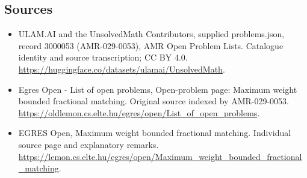 \documentclass[11pt,a4paper]{article}
\begin{document}
\subsection{Sources}
\begin{itemize}
\item[S1] ULAM.AI and the UnsolvedMath Contributors, supplied problems.json, record 3000053 (AMR-029-0053), AMR Open Problem Lists. Catalogue identity and source transcription; CC BY 4.0.
\url{https://huggingface.co/datasets/ulamai/UnsolvedMath}.
\item[S2] Egres Open - List of open problems, Open-problem page: Maximum weight bounded fractional matching. Original source indexed by AMR-029-0053.
\url{https://oldlemon.cs.elte.hu/egres/open/List_of_open_problems}.
\item[S3] EGRES Open, Maximum weight bounded fractional matching. Individual source page and explanatory remarks.
\url{https://lemon.cs.elte.hu/egres/open/Maximum_weight_bounded_fractional_matching}.
\end{itemize}
\end{document}
